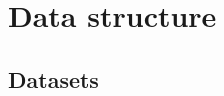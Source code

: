 \documentclass[t]{beamer}
\begin{document}
	\section{Data structure}

  \subsection{Datasets}
  

	
\end{document}
